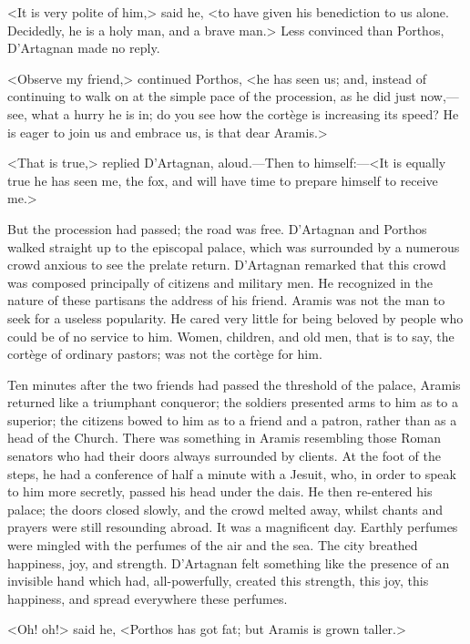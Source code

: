 <It is very polite of him,> said he, <to have given his benediction to us alone. Decidedly, he is a holy man, and a brave man.> Less convinced than Porthos, D'Artagnan made no reply.

<Observe my friend,> continued Porthos, <he has seen us; and, instead of continuing to walk on at the simple pace of the procession, as he did just now,—see, what a hurry he is in; do you see how the cortège is increasing its speed? He is eager to join us and embrace us, is that dear Aramis.>

<That is true,> replied D'Artagnan, aloud.—Then to himself:—<It is equally true he has seen me, the fox, and will have time to prepare himself to receive me.>

But the procession had passed; the road was free. D'Artagnan and Porthos walked straight up to the episcopal palace, which was surrounded by a numerous crowd anxious to see the prelate return. D'Artagnan remarked that this crowd was composed principally of citizens and military men. He recognized in the nature of these partisans the address of his friend. Aramis was not the man to seek for a useless popularity. He cared very little for being beloved by people who could be of no service to him. Women, children, and old men, that is to say, the cortège of ordinary pastors; was not the cortège for him.

Ten minutes after the two friends had passed the threshold of the palace, Aramis returned like a triumphant conqueror; the soldiers presented arms to him as to a superior; the citizens bowed to him as to a friend and a patron, rather than as a head of the Church. There was something in Aramis resembling those Roman senators who had their doors always surrounded by clients. At the foot of the steps, he had a conference of half a minute with a Jesuit, who, in order to speak to him more secretly, passed his head under the dais. He then re-entered his palace; the doors closed slowly, and the crowd melted away, whilst chants and prayers were still resounding abroad. It was a magnificent day. Earthly perfumes were mingled with the perfumes of the air and the sea. The city breathed happiness, joy, and strength. D'Artagnan felt something like the presence of an invisible hand which had, all-powerfully, created this strength, this joy, this happiness, and spread everywhere these perfumes.

<Oh! oh!> said he, <Porthos has got fat; but Aramis is grown taller.> 